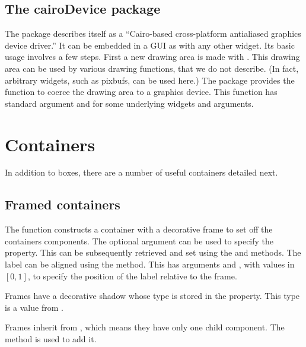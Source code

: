 \subsection{The cairoDevice package}
\label{sec:cairodevice-package}

The package  describes itself as a ``Cairo-based
cross-platform antialiased graphics device driver.''  It can be
embedded in a  GUI as with any other widget. Its basic
usage involves a few steps. First a new drawing area is made with
. This drawing area can be
used by various drawing functions, that we do not describe. (In fact,
arbitrary widgets, such as pixbufs, can be used here.) The
 package provides the function
 to coerce the drawing area to a graphics
device. This function has standard argument
 and for some underlying widgets
 and  arguments.

\section{Containers}
\label{sec:containers}


In addition to boxes, there are a number of useful containers detailed
next. 


\subsection{Framed containers}
\label{sec:RGtk2:gtkFrame}

The  function constructs a container with a
decorative frame to set off the containers components. The optional
 argument can be used to specify the
 property. This can be subsequently retrieved and set
using the  and 
methods. The label can be aligned using the
 method. This has arguments
 and , with values in $[0,1]$, to specify the position of the label
relative to the frame.

Frames have a decorative shadow whose type is stored in the
 property. This type is a value from .

Frames inherit from , which means they have only one
child component. The  method is used to add
it.

